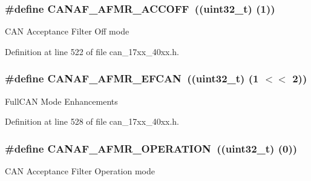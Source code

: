 \subsubsection[{\texorpdfstring{C\+A\+N\+A\+F\+\_\+\+A\+F\+M\+R\+\_\+\+A\+C\+C\+O\+FF}{CANAF_AFMR_ACCOFF}}]{\setlength{\rightskip}{0pt plus 5cm}\#define C\+A\+N\+A\+F\+\_\+\+A\+F\+M\+R\+\_\+\+A\+C\+C\+O\+FF~((uint32\+\_\+t) (1))}\hypertarget{group__CAN__17XX__40XX_ga1746504019bacce82b5018f18dc7e710}{}\label{group__CAN__17XX__40XX_ga1746504019bacce82b5018f18dc7e710}
C\+AN Acceptance Filter Off mode 

Definition at line 522 of file can\+\_\+17xx\+\_\+40xx.\+h.

\subsubsection[{\texorpdfstring{C\+A\+N\+A\+F\+\_\+\+A\+F\+M\+R\+\_\+\+E\+F\+C\+AN}{CANAF_AFMR_EFCAN}}]{\setlength{\rightskip}{0pt plus 5cm}\#define C\+A\+N\+A\+F\+\_\+\+A\+F\+M\+R\+\_\+\+E\+F\+C\+AN~((uint32\+\_\+t) (1 $<$$<$ 2))}\hypertarget{group__CAN__17XX__40XX_ga88269b6aec8e17003920d83d5454578d}{}\label{group__CAN__17XX__40XX_ga88269b6aec8e17003920d83d5454578d}
Full\+C\+AN Mode Enhancements 

Definition at line 528 of file can\+\_\+17xx\+\_\+40xx.\+h.

\subsubsection[{\texorpdfstring{C\+A\+N\+A\+F\+\_\+\+A\+F\+M\+R\+\_\+\+O\+P\+E\+R\+A\+T\+I\+ON}{CANAF_AFMR_OPERATION}}]{\setlength{\rightskip}{0pt plus 5cm}\#define C\+A\+N\+A\+F\+\_\+\+A\+F\+M\+R\+\_\+\+O\+P\+E\+R\+A\+T\+I\+ON~((uint32\+\_\+t) (0))}\hypertarget{group__CAN__17XX__40XX_ga76c064827ea8236b6a195525ffeff007}{}\label{group__CAN__17XX__40XX_ga76c064827ea8236b6a195525ffeff007}
C\+AN Acceptance Filter Operation mode 


